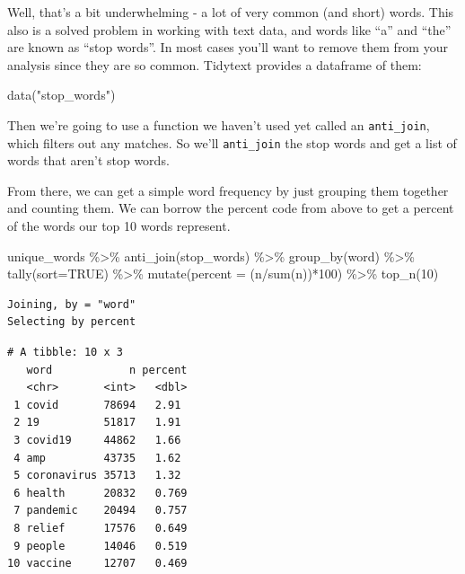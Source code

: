 \documentclass[
  letterpaper,
  DIV=11,
  numbers=noendperiod]{scrreprt}
\newenvironment{Shaded}{\begin{snugshade}}{\end{snugshade}}
\newcommand{\AttributeTok}[1]{\textcolor[rgb]{0.40,0.45,0.13}{#1}}
\newcommand{\ConstantTok}[1]{\textcolor[rgb]{0.56,0.35,0.01}{#1}}
\newcommand{\DecValTok}[1]{\textcolor[rgb]{0.68,0.00,0.00}{#1}}
\newcommand{\FunctionTok}[1]{\textcolor[rgb]{0.28,0.35,0.67}{#1}}
\newcommand{\NormalTok}[1]{\textcolor[rgb]{0.00,0.23,0.31}{#1}}
\newcommand{\SpecialCharTok}[1]{\textcolor[rgb]{0.37,0.37,0.37}{#1}}
\newcommand{\StringTok}[1]{\textcolor[rgb]{0.13,0.47,0.30}{#1}}
\begin{document}
Well, that's a bit underwhelming - a lot of very common (and short)
words. This also is a solved problem in working with text data, and
words like ``a'' and ``the'' are known as ``stop words''. In most cases
you'll want to remove them from your analysis since they are so common.
Tidytext provides a dataframe of them:

\begin{Shaded}
\begin{Highlighting}[]
\FunctionTok{data}\NormalTok{(}\StringTok{"stop\_words"}\NormalTok{)}
\end{Highlighting}
\end{Shaded}

Then we're going to use a function we haven't used yet called an
\texttt{anti\_join}, which filters out any matches. So we'll
\texttt{anti\_join} the stop words and get a list of words that aren't
stop words.

From there, we can get a simple word frequency by just grouping them
together and counting them. We can borrow the percent code from above to
get a percent of the words our top 10 words represent.

\begin{Shaded}
\begin{Highlighting}[]
\NormalTok{unique\_words }\SpecialCharTok{\%\textgreater{}\%}
  \FunctionTok{anti\_join}\NormalTok{(stop\_words) }\SpecialCharTok{\%\textgreater{}\%}
  \FunctionTok{group\_by}\NormalTok{(word) }\SpecialCharTok{\%\textgreater{}\%}
  \FunctionTok{tally}\NormalTok{(}\AttributeTok{sort=}\ConstantTok{TRUE}\NormalTok{) }\SpecialCharTok{\%\textgreater{}\%}
  \FunctionTok{mutate}\NormalTok{(}\AttributeTok{percent =}\NormalTok{ (n}\SpecialCharTok{/}\FunctionTok{sum}\NormalTok{(n))}\SpecialCharTok{*}\DecValTok{100}\NormalTok{) }\SpecialCharTok{\%\textgreater{}\%}
  \FunctionTok{top\_n}\NormalTok{(}\DecValTok{10}\NormalTok{)}
\end{Highlighting}
\end{Shaded}

\begin{verbatim}
Joining, by = "word"
Selecting by percent
\end{verbatim}

\begin{verbatim}
# A tibble: 10 x 3
   word            n percent
   <chr>       <int>   <dbl>
 1 covid       78694   2.91 
 2 19          51817   1.91 
 3 covid19     44862   1.66 
 4 amp         43735   1.62 
 5 coronavirus 35713   1.32 
 6 health      20832   0.769
 7 pandemic    20494   0.757
 8 relief      17576   0.649
 9 people      14046   0.519
10 vaccine     12707   0.469
\end{verbatim}
\end{document}
